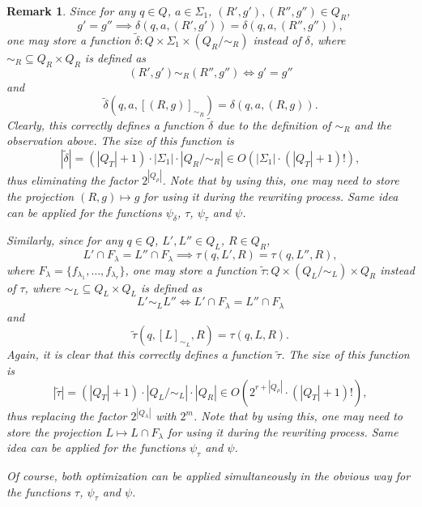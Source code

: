 \documentclass{article}
\newtheorem{remark}[definition]{Remark}
\newcommand{\len}[1]{\ensuremath{\left| #1 \right|}}
\begin{document}
	\begin{remark} \label{remark:factorize_set_of_states}
		Since for any $q\in Q$, $a\in\Sigma_1$, $(R', g'), (R'', g'')\in Q_R$,
		\[ g'=g'' \implies \delta(q, a, (R', g')) = \delta(q, a, (R'', g'')), \]
		one may store a function $\tilde{\delta}: Q\times\Sigma_1\times(Q_R/{\sim_R})$ instead of $\delta$, where
		$\sim_R\subseteq Q_R\times Q_R$ is defined as
		\[ (R', g') \sim_R (R'', g'') \iff g' = g'' \]
		and
		\[ \tilde{\delta}(q, a, [(R, g)]_{\sim_R}) = \delta(q, a, (R, g)). \]
		Clearly, this correctly defines a function $\tilde{\delta}$ due to the definition of $\sim_R$ and the observation above.
		The size of this function is
		\[ \len{\tilde{\delta}} = (\len{Q_T}+1)\cdot\len{\Sigma_1}\cdot\len{Q_R/{\sim_R}} \in O(\len{\Sigma_1}\cdot(\len{Q_T}+1)!), \]
		thus eliminating the factor $2^{\len{Q_\rho}}$.
		Note that by using this, one may need to store the projection $(R, g)\mapsto g$ for using it during the rewriting process.
		Same idea can be applied for the functions $\psi_\delta$, $\tau$, $\psi_\tau$ and $\psi$.
		
		Similarly, since for any $q\in Q$, $L', L''\in Q_L$, $R\in Q_R$,
		\[ L' \cap F_\lambda = L'' \cap F_\lambda \implies \tau(q, L', R) = \tau(q, L'', R), \]
		where $F_\lambda = \{ f_{\lambda_1}, \ldots, f_{\lambda_r} \}$, one may store a function $\tilde{\tau}: Q\times(Q_L/\sim_L)\times Q_R$ instead of $\tau$, where $\sim_L\subseteq Q_L\times Q_L$ is defined as
		\[ L' \sim_L L'' \iff L' \cap F_\lambda = L'' \cap F_\lambda \]
		and
		\[ \tilde{\tau}(q, [L]_{\sim_L}, R) = \tau(q, L, R). \]
		Again, it is clear that this correctly defines a function $\tilde{\tau}$.
		The size of this function is
		\[ \len{\tilde{\tau}} = (\len{Q_T}+1)\cdot\len{Q_L/{\sim_L}}\cdot\len{Q_R} \in O(2^{r+\len{Q_\rho}}\cdot(\len{Q_T}+1)!), \]
		thus replacing the factor $2^{\len{Q_\lambda}}$ with $2^m$.
		Note that by using this, one may need to store the projection $L\mapsto L\cap F_\lambda$ for using it during the rewriting process. Same idea can be applied for the functions $\psi_\tau$ and $\psi$.
		
		Of course, both optimization can be applied simultaneously in the obvious way for the functions $\tau$, $\psi_\tau$ and $\psi$.
	\end{remark}
\end{document}
